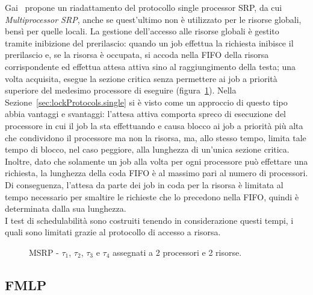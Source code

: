 Gai~\cite{Gai:2003:CMM:827266.828537} propone un riadattamento del protocollo single processor SRP, da cui \textit{Multiprocessor SRP}, anche se quest'ultimo non è utilizzato per le risorse globali, bensì per quelle locali. La gestione dell'accesso alle risorse globali è gestito tramite inibizione del prerilascio: quando un job effettua la richiesta inibisce il prerilascio e, se la risorsa è occupata, si accoda nella FIFO della risorsa corrispondente ed effettua attesa attiva sino al raggiungimento della testa; una volta acquisita, esegue la sezione critica senza permettere ai job a priorità superiore del medesimo processore di eseguire (figura~\ref{fig:MSRP}). Nella Sezione~\ref{sec:lockProtocols.single} si è visto come un approccio di questo tipo abbia vantaggi e svantaggi: l'attesa attiva comporta spreco di esecuzione del processore in cui il job la sta effettuando e causa blocco ai job a priorità più alta che condividono il processore ma non la risorsa, ma, allo stesso tempo, limita tale tempo di blocco, nel caso peggiore, alla lunghezza di un'unica sezione critica. Inoltre, dato che solamente un job alla volta per ogni processore può effettare una richiesta, la lunghezza della coda FIFO è al massimo pari al numero di processori. Di conseguenza, l'attesa da parte dei job in coda per la risorsa è limitata al tempo necessario per smaltire le richieste che lo precedono nella FIFO, quindi è determinata dalla sua lunghezza.\\
I test di schedulabilità sono costruiti tenendo in considerazione questi tempi, i quali sono limitati grazie al protocollo di accesso a risorsa.

\begin{figure}
\centering
\MSRP
\caption{MSRP - $\tau_1$, $\tau_2$, $\tau_3$ e $\tau_4$ assegnati a 2 processori e 2 risorse.}
\label{fig:MSRP}
\end{figure}

\subsection{FMLP}
\label{sec:lockProtocols.fmlp}

